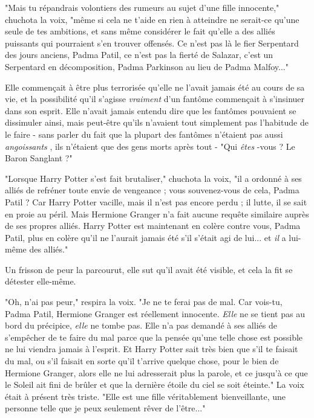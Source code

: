 "Mais tu répandrais volontiers des rumeurs au sujet d'une fille innocente," chuchota la voix, "même si cela ne t'aide en rien à atteindre ne serait-ce qu'une seule de tes ambitions, et sans même considérer le fait qu'elle a des alliés puissants qui pourraient s'en trouver offensés. Ce n'est pas là le fier Serpentard des jours anciens, Padma Patil, ce n'est pas la fierté de Salazar, c'est un Serpentard en décomposition, Padma Parkinson au lieu de Padma Malfoy..."

Elle commençait à être plus terrorisée qu'elle ne l'avait jamais été au cours de sa vie, et la possibilité qu'il s'agisse \emph{vraiment}  d'un fantôme commençait à s'insinuer dans son esprit. Elle n'avait jamais entendu dire que les fantômes pouvaient se dissimuler ainsi, mais peut-être qu'ils n'avaient tout simplement pas l'habitude de le faire - sans parler du fait que la plupart des fantômes n'étaient pas aussi \emph{angoissants} , ils n'étaient que des gens morts après tout - "Qui \emph{êtes} -vous ? Le Baron Sanglant ?"

"Lorsque Harry Potter s'est fait brutaliser," chuchota la voix, "il a ordonné à ses alliés de refréner toute envie de vengeance ; vous souvenez-vous de cela, Padma Patil ? Car Harry Potter vacille, mais il n'est pas encore perdu ; il lutte, il se sait en proie au péril. Mais Hermione Granger n'a fait aucune requête similaire auprès de ses propres alliés. Harry Potter est maintenant en colère contre vous, Padma Patil, plus en colère qu'il ne l'aurait jamais été s'il s'était agi de lui... et \emph{il}  a lui-même des alliés."

Un frisson de peur la parcourut, elle sut qu'il avait été visible, et cela la fit se détester elle-même.

"Oh, n'ai pas peur," respira la voix. "Je ne te ferai pas de mal. Car vois-tu, Padma Patil, Hermione Granger est réellement innocente. \emph{Elle}  ne se tient pas au bord du précipice, \emph{elle}  ne tombe pas. Elle n'a pas demandé à ses alliés de s'empêcher de te faire du mal parce que la pensée qu'une telle chose est possible ne lui viendra jamais à l'esprit. Et Harry Potter sait très bien que s'il te faisait du mal, ou s'il faisait en sorte qu'il t'arrive quelque chose, pour le bien de Hermione Granger, alors elle ne lui adresserait plus la parole, et ce jusqu'à ce que le Soleil ait fini de brûler et que la dernière étoile du ciel se soit éteinte." La voix était à présent très triste. "Elle est une fille véritablement bienveillante, une personne telle que je peux seulement rêver de l'être..."

